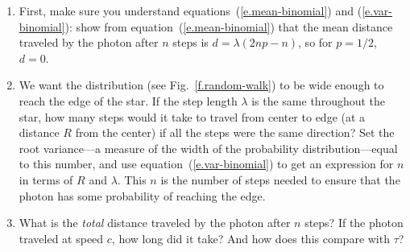 \begin{exercisebox}
\begin{enumerate}
\item
First, make sure you understand equations~(\ref{e.mean-binomial}) and (\ref{e.var-binomial}): show from equation~(\ref{e.mean-binomial}) that the mean distance traveled by the photon after $n$ steps is $d = \lambda(2np-n)$, so for $p=1/2$, $d = 0$.

\item
We want the distribution (see Fig.~\ref{f.random-walk}) to be wide enough to reach the edge of the star.  If the step length $\lambda$ is the same throughout the star, how many steps would it take to travel from center to edge (at a distance $R$ from the center) if all the steps were the same direction?  Set the root variance---a measure of the width of the probability distribution---equal to this number, and use equation~(\ref{e.var-binomial}) to get an expression for $n$ in terms of $R$ and $\lambda$. This $n$ is the number of steps needed to ensure that the photon has some probability of reaching the edge.

\item
What is the \emph{total} distance traveled by the photon after $n$ steps? If the photon traveled at speed $c$, how long did it take?  And how does this compare with $\tau$?

\end{enumerate}
\end{exercisebox}
